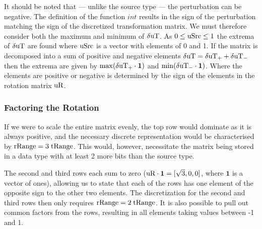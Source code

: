 It should be noted that --- unlike the source type \uSrc --- the perturbation can be negative. The definition of the function $int$ results in the sign of the perturbation matching the sign of the discretized transformation matrix. We must therefore consider both the maximum and minimum of $\delta\text{uT}$. As $0 \le\text{uSrc} \le 1$ the extrema of $\delta\text{uT}$ are found where $\text{uSrc}$ is a vector with elements of 0 and 1. If the matrix is decomposed into a sum of positive and negative elements $\delta\text{uT} = \delta\text{uT}_+ + \delta\text{uT}_-$ then the extrema are given by $\max(\delta\text{uT}_+ \cdot \mathbf{1})$ and $\min(\delta\text{uT}_- \cdot \mathbf{1})$. Where the elements are positive or negative is determined by the sign of the elements in the rotation matrix $\text{uR}$.



\subsubsection{Factoring the Rotation}



If we were to scale the entire matrix evenly, the top row would dominate as it is always positive, and the necessary discrete representation would be characterised by $\text{rRange} = 3 \; \text{tRange}$. This would, however, necessitate the matrix being stored in a data type with at least 2 more bits than the source type.



The second and third rows each sum to zero ($\text{uR} \cdot \mathbf{1} = [\sqrt{3},0,0]$, where $\mathbf{1}$ is a vector of ones), allowing us to state that each of the rows has one element of the opposite sign to the other two elements. The discretization for the second and third rows then only requires $\text{rRange} = 2 \; \text{tRange}$. It is also possible to pull out common factors from the rows, resulting in all elements taking values between -1 and 1.




